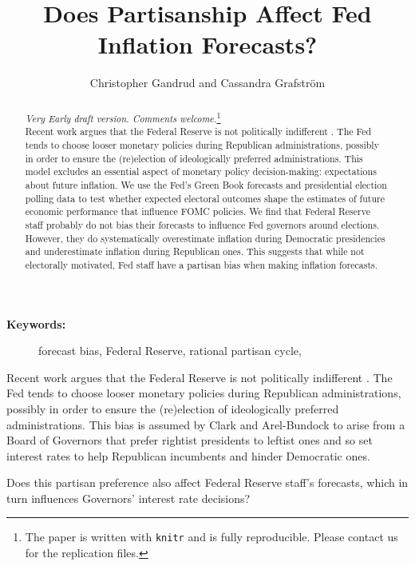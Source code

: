 \documentclass[a4paper]{article}\usepackage{graphicx, color}
\title{Does Partisanship Affect Fed Inflation Forecasts?}
\author{Christopher Gandrud and Cassandra Grafstr\"{o}m}
\begin{document}
\maketitle

\begin{abstract}
\noindent\emph{Very Early draft version. Comments welcome.}\footnote{The paper is written with {\tt{knitr}} \citep{knitr2012} and is fully reproducible. Please contact us for the replication files.} \\[0.2cm]
Recent work argues that the Federal Reserve is not politically indifferent \citep{Clark2011}. The Fed tends to choose looser monetary policies during Republican administrations, possibly in order to ensure the (re)election of ideologically preferred administrations. This model excludes an essential aspect of monetary policy decision-making: expectations about future inflation. We use the Fed's Green Book forecasts and presidential election polling data to test whether expected electoral outcomes shape the estimates of future economic performance that influence FOMC policies. We find that Federal Reserve staff probably do not bias their forecasts to influence Fed governors around elections. However, they do systematically overestimate inflation during Democratic presidencies and underestimate inflation during Republican ones. This suggests that while not electorally motivated, Fed staff have a partisan bias when making inflation forecasts.

\end{abstract}

\begin{description}
  \item [{\textbf{Keywords:}}] forecast bias, Federal Reserve, rational partisan cycle,
\end{description}

\vspace{0.3cm}

Recent work argues that the Federal Reserve is not politically indifferent \citep{Clark2011}. The Fed tends to choose looser monetary policies during Republican administrations, possibly in order to ensure the (re)election of ideologically preferred administrations. This bias is assumed by Clark and Arel-Bundock to arise from a Board of Governors that prefer rightist presidents to leftist ones and so set interest rates to help Republican incumbents and hinder Democratic ones. 

Does this partisan preference also affect Federal Reserve staff's forecasts, which in turn influences Governors' interest rate decisions? 
\end{document}
